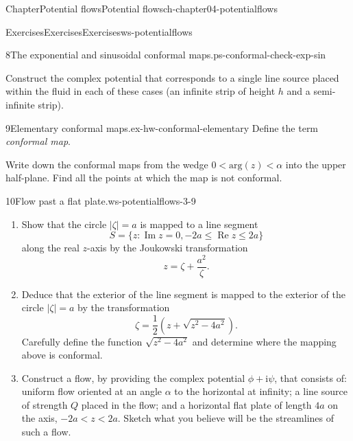 \documentclass[oneside,10pt,]{book}
\numberwithin{equation}{section}
\renewcommand*{\Re}{\operatorname{Re}}
\renewcommand*{\Im}{\operatorname{Im}}
\newcommand{\im}{\mathrm{i}}
\begin{document}
\begin{chapterptx}{Chapter}{Potential flows}{}{Potential flows}{}{}{ch-chapter04-potentialflows}
\begin{exercises-section}{Exercises}{Exercises}{}{Exercises}{}{}{ws-potentialflows}
\begin{exercisegroup}
\begin{divisionexerciseeg}{8}{The exponential and sinusoidal conformal maps.}{}{ps-conformal-check-exp-sin}
\par
Construct the complex potential that corresponds to a single line source placed within the fluid in each of these cases (an infinite strip of height \(h\) and a semi-infinite strip).%
\end{divisionexerciseeg}%
\begin{divisionexerciseeg}{9}{Elementary conformal maps.}{}{ex-hw-conformal-elementary}%
Define the term \emph{conformal map}.%
\par
Write down the conformal maps from the wedge \(0 < \textrm{arg}(z) < \alpha\) into the upper half-plane. Find all the points at which the map is not conformal.%
\end{divisionexerciseeg}%
\begin{divisionexerciseeg}{10}{Flow past a flat plate.}{}{ws-potentialflows-3-9}%
\begin{enumerate}[font=\bfseries,label=(\alph*),ref=\alph*]%
\item{}Show that the circle \(|\zeta| = a\) is mapped to a line segment%
\begin{equation*}
S = \{ z: \Im z = 0, -2a \leq \Re z \leq 2a\}
\end{equation*}
along the real \(z\)-axis by the Joukowski transformation%
\begin{equation*}
z = \zeta + \frac{a^2}{\zeta}.
\end{equation*}
%
\item{}Deduce that the exterior of the line segment is mapped to the exterior of the circle \(|\zeta| = a\) by the transformation%
\begin{equation*}
\zeta = \frac{1}{2}\left( z + \sqrt{z^2 - 4a^2}\right).
\end{equation*}
Carefully define the function \(\sqrt{z^2 - 4a^2}\) and determine where the mapping above is conformal.%
\item{}Construct a flow, by providing the complex potential \(\phi + \im \psi\), that consists of: uniform flow oriented at an angle \(\alpha\) to the horizontal at infinity; a line source of strength \(Q\) placed in the flow; and a horizontal flat plate of length \(4a\) on the axis, \(-2a < z < 2a\). Sketch what you believe will be the streamlines of such a flow.%
\end{enumerate}%
\end{divisionexerciseeg}%
\end{exercisegroup}
\par\medskip\noindent
\end{exercises-section}
\end{chapterptx}
\end{document}
